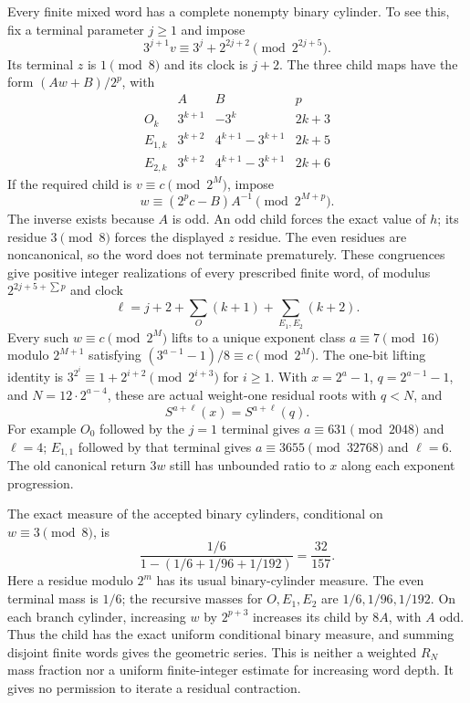 \documentclass[11pt]{article}
\begin{document}
Every finite mixed word has a complete nonempty binary cylinder.
To see this, fix a terminal parameter $j\ge1$ and impose
\[
3^{j+1}v\equiv3^j+2^{2j+2}\pmod{2^{2j+5}}.
\]
Its terminal $z$ is $1\pmod8$ and its clock is $j+2$.
The three child maps have the form $(Aw+B)/2^p$, with
\[
\begin{array}{c|c|c|c}
&A&B&p\\\hline
O_k&3^{k+1}&-3^k&2k+3\\
E_{1,k}&3^{k+2}&4^{k+1}-3^{k+1}&2k+5\\
E_{2,k}&3^{k+2}&4^{k+1}-3^{k+1}&2k+6
\end{array}
\]
If the required child is $v\equiv c\pmod{2^M}$, impose
\[
w\equiv(2^pc-B)A^{-1}\pmod{2^{M+p}}.
\]
The inverse exists because $A$ is odd. An odd child forces the exact
value of $h$; its residue $3\pmod8$ forces the displayed $z$ residue.
The even residues are noncanonical, so the word does not terminate
prematurely. These congruences give positive integer realizations of
every prescribed finite word, of modulus $2^{2j+5+\sum p}$ and clock
\[
\ell=j+2+\sum_O(k+1)+\sum_{E_1,E_2}(k+2).
\]
Every such $w\equiv c\pmod{2^M}$ lifts to a unique exponent class
$a\equiv7\pmod{16}$ modulo $2^{M+1}$ satisfying
$(3^{a-1}-1)/8\equiv c\pmod{2^M}$. The one-bit lifting identity is
$3^{2^i}\equiv1+2^{i+2}\pmod{2^{i+3}}$ for $i\ge1$.
With $x=2^a-1$, $q=2^{a-1}-1$, and $N=12\cdot2^{a-4}$,
these are actual weight-one residual roots with $q<N$, and
\[
S^{a+\ell}(x)=S^{a+\ell}(q).
\]
For example $O_0$ followed by the $j=1$ terminal gives
$a\equiv631\pmod{2048}$ and $\ell=4$;
$E_{1,1}$ followed by that terminal gives
$a\equiv3655\pmod{32768}$ and $\ell=6$.
The old canonical return $3w$ still has unbounded ratio to $x$
along each exponent progression.

The exact measure of the accepted binary cylinders, conditional on
$w\equiv3\pmod8$, is
\[
\frac{1/6}{1-(1/6+1/96+1/192)}=\frac{32}{157}.
\]
Here a residue modulo $2^m$ has its usual binary-cylinder measure.
The even terminal mass is $1/6$; the recursive masses for $O,E_1,E_2$
are $1/6,1/96,1/192$. On each branch cylinder, increasing $w$ by
$2^{p+3}$ increases its child by $8A$, with $A$ odd. Thus the child
has the exact uniform conditional binary measure, and summing disjoint
finite words gives the geometric series. This is neither a weighted
$R_N$ mass fraction nor a uniform finite-integer estimate for increasing
word depth. It gives no permission to iterate a residual contraction.
\end{document}
